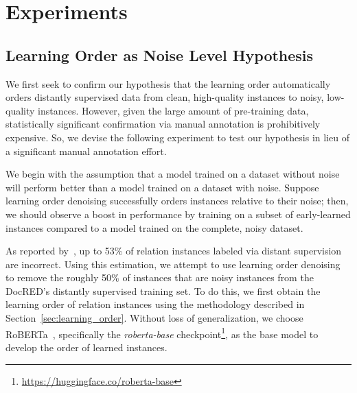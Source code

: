 \section{Experiments}
\subsection{Learning Order as Noise Level Hypothesis}\label{sec:learning_order_hypothesis}
We first seek to confirm our hypothesis that the learning order automatically orders distantly supervised data from clean, high-quality instances to noisy, low-quality instances. However, given the large amount of pre-training data, statistically significant confirmation via manual annotation is prohibitively expensive. So, we devise the following experiment to test our hypothesis in lieu of a significant manual annotation effort.

We begin with the assumption that a model trained on a dataset without noise will perform better than a model trained on a dataset with noise. Suppose learning order denoising successfully orders instances relative to their noise; then, we should observe a boost in performance by training on a subset of early-learned instances compared to a model trained on the complete, noisy dataset.

As reported by~\citet{Gao2021ManualEM}, up to 53\% of relation instances labeled via distant supervision are incorrect. Using this estimation, we attempt to use learning order denoising to remove the roughly 50\% of instances that are noisy instances from the DocRED's distantly supervised training set. To do this, we first obtain the learning order of relation instances using the methodology described in Section~\ref{sec:learning_order}. Without loss of generalization, we choose RoBERTa~\cite{Liu2019RoBERTaAR}, specifically the \textit{roberta-base} checkpoint\footnote{\url{https://huggingface.co/roberta-base}}, as the base model to develop the order of learned instances. 


\begin{table}[t]
\centering
{} \caption{Results comparing performance on the DocRED test set using trimmed sets of distantly supervised training data. The \textit{batch-based} and \textit{epoch-based} training sets consist of training instances determined by the instances learned within the first epoch using the respective learning order collection methods.}
\label{tab:batch_vs_epoch_based}
\end{table}

